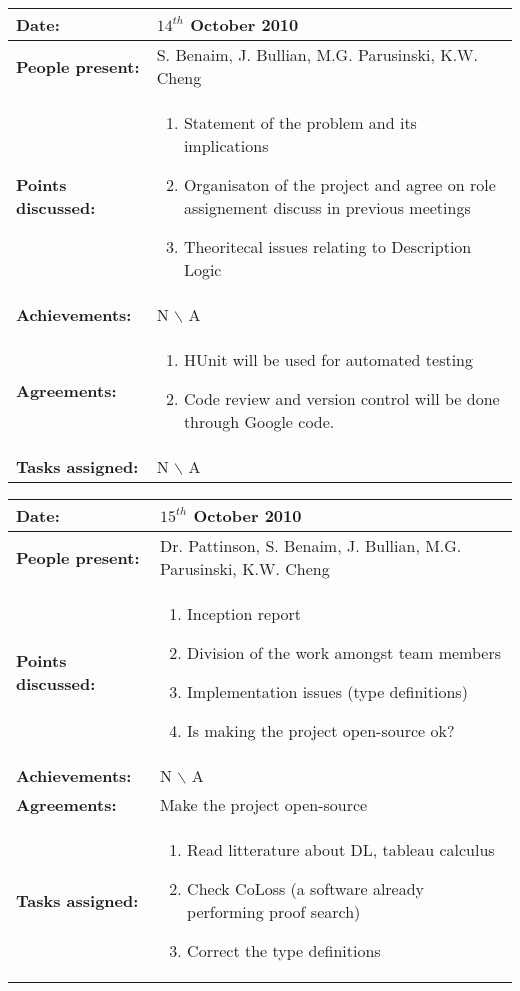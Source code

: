 \documentclass[12pt,a4paper]{article}
\newcommand{\meeting}[6]{%
\begin{center}%
\begin{longtable}{| p{3.5cm} | | p{13cm} |}%
\hline%
\textbf{Date:} & #1 \\%
\hline%
\textbf{People present:} &#2 \\%
\hline%
\textbf{Points discussed:} &#3\\%
\hline%
\textbf{Achievements:} &#4 \\%
\hline%
\textbf{Agreements:} &#5 \\%
\hline%
\textbf{Tasks assigned:} &#6  \\%
\hline%
\end{longtable}%
\end{center}%
\bigbreak
}
\begin{document}
\meeting{$14^{th}$ October 2010}%
{S. Benaim, J. Bullian, M.G. Parusinski, K.W. Cheng}%
{ \begin{enumerate} \item Statement of the problem and its implications 
 \item Organisaton of the project and agree on role assignement discuss in 
previous meetings
\item Theoritecal issues relating to Description Logic
\end{enumerate} }%
{ N $\backslash$ A}%
{ \begin{enumerate}
\item HUnit will be used for automated testing
\item Code review and version control will be done through Google code. 
\end{enumerate}}%
{N $\backslash$ A}

\meeting{$15^{th}$ October 2010}%
{Dr. Pattinson, S. Benaim, J. Bullian, M.G. Parusinski, K.W. Cheng}%
{ \begin{enumerate} \item Inception report
\item Division of the work amongst team members
\item Implementation issues (type definitions)
\item Is making the project open-source ok?
\end{enumerate} }%
{ N $\backslash$ A}%
{Make the project open-source}
{ \begin{enumerate}
\item Read litterature about DL, tableau calculus
\item Check CoLoss (a software already performing proof search)
\item Correct the type definitions 
\end{enumerate}}%
\end{document}

